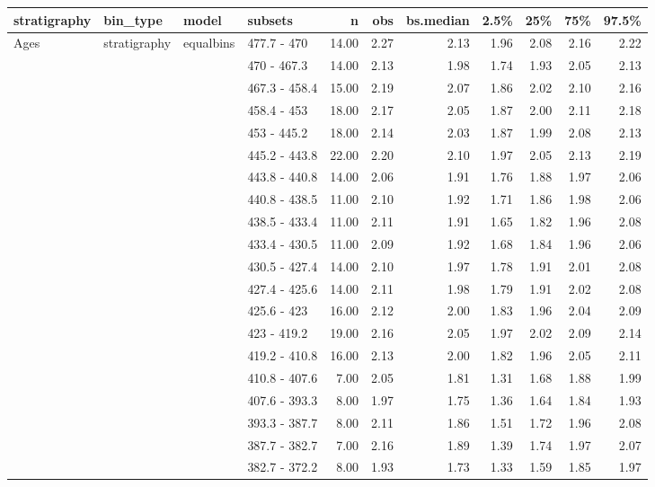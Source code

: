 \begin{longtable}{llllrrrrrrr}
  \hline
stratigraphy & bin\_type & model & subsets & n & obs & bs.median & 2.5\% & 25\% & 75\% & 97.5\% \\ 
  \hline
Ages & stratigraphy & equalbins & 477.7 - 470 & 14.00 & 2.27 & 2.13 & 1.96 & 2.08 & 2.16 & 2.22 \\ 
   &  &  & 470 - 467.3 & 14.00 & 2.13 & 1.98 & 1.74 & 1.93 & 2.05 & 2.13 \\ 
   &  &  & 467.3 - 458.4 & 15.00 & 2.19 & 2.07 & 1.86 & 2.02 & 2.10 & 2.16 \\ 
   &  &  & 458.4 - 453 & 18.00 & 2.17 & 2.05 & 1.87 & 2.00 & 2.11 & 2.18 \\ 
   &  &  & 453 - 445.2 & 18.00 & 2.14 & 2.03 & 1.87 & 1.99 & 2.08 & 2.13 \\ 
   &  &  & 445.2 - 443.8 & 22.00 & 2.20 & 2.10 & 1.97 & 2.05 & 2.13 & 2.19 \\ 
   &  &  & 443.8 - 440.8 & 14.00 & 2.06 & 1.91 & 1.76 & 1.88 & 1.97 & 2.06 \\ 
   &  &  & 440.8 - 438.5 & 11.00 & 2.10 & 1.92 & 1.71 & 1.86 & 1.98 & 2.06 \\ 
   &  &  & 438.5 - 433.4 & 11.00 & 2.11 & 1.91 & 1.65 & 1.82 & 1.96 & 2.08 \\ 
   &  &  & 433.4 - 430.5 & 11.00 & 2.09 & 1.92 & 1.68 & 1.84 & 1.96 & 2.06 \\ 
   &  &  & 430.5 - 427.4 & 14.00 & 2.10 & 1.97 & 1.78 & 1.91 & 2.01 & 2.08 \\ 
   &  &  & 427.4 - 425.6 & 14.00 & 2.11 & 1.98 & 1.79 & 1.91 & 2.02 & 2.08 \\ 
   &  &  & 425.6 - 423 & 16.00 & 2.12 & 2.00 & 1.83 & 1.96 & 2.04 & 2.09 \\ 
   &  &  & 423 - 419.2 & 19.00 & 2.16 & 2.05 & 1.97 & 2.02 & 2.09 & 2.14 \\ 
   &  &  & 419.2 - 410.8 & 16.00 & 2.13 & 2.00 & 1.82 & 1.96 & 2.05 & 2.11 \\ 
   &  &  & 410.8 - 407.6 & 7.00 & 2.05 & 1.81 & 1.31 & 1.68 & 1.88 & 1.99 \\ 
   &  &  & 407.6 - 393.3 & 8.00 & 1.97 & 1.75 & 1.36 & 1.64 & 1.84 & 1.93 \\ 
   &  &  & 393.3 - 387.7 & 8.00 & 2.11 & 1.86 & 1.51 & 1.72 & 1.96 & 2.08 \\ 
   &  &  & 387.7 - 382.7 & 7.00 & 2.16 & 1.89 & 1.39 & 1.74 & 1.97 & 2.07 \\ 
   &  &  & 382.7 - 372.2 & 8.00 & 1.93 & 1.73 & 1.33 & 1.59 & 1.85 & 1.97 \\ 

\end{longtable}
